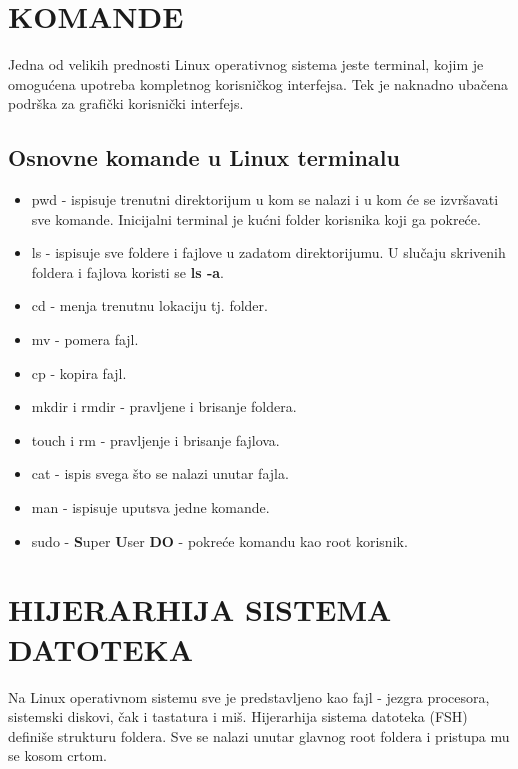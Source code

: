 \documentclass[a4paper,14pt]{article}
\begin{document}
\section{KOMANDE}
Jedna od velikih prednosti Linux operativnog sistema jeste terminal, kojim je omogućena upotreba kompletnog korisničkog interfejsa. Tek je naknadno ubačena podrška za grafički korisnički interfejs.
\subsection{Osnovne komande u Linux terminalu}
\begin{itemize}
\item pwd - ispisuje trenutni direktorijum u kom se nalazi i u kom će se izvršavati sve komande. Inicijalni terminal je kućni folder korisnika koji ga pokreće.
\item ls - ispisuje sve foldere i fajlove u zadatom direktorijumu. U slučaju skrivenih foldera i fajlova koristi se \textbf{ls -a}.
\item cd - menja trenutnu lokaciju tj. folder.
\item mv - pomera fajl.
\item cp - kopira fajl.
\item mkdir i rmdir - pravljene i brisanje foldera.
\item touch i rm - pravljenje i brisanje fajlova.
\item cat - ispis svega što se nalazi unutar fajla.
\item man - ispisuje uputsva jedne komande.
\item sudo - \textbf{S}uper \textbf{U}ser \textbf{DO} - pokreće komandu kao root korisnik.
\end{itemize}
\newpage

\section{HIJERARHIJA SISTEMA DATOTEKA}
Na Linux operativnom sistemu sve je predstavljeno kao fajl - jezgra procesora, sistemski diskovi, čak i tastatura i miš. Hijerarhija sistema datoteka (FSH) definiše strukturu foldera. Sve se nalazi unutar glavnog root foldera i pristupa mu se kosom crtom.
\end{document}
